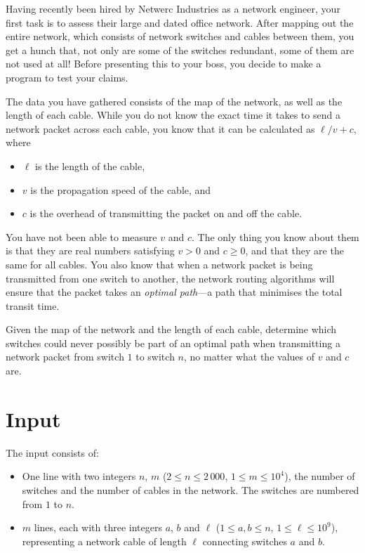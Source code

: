 
%
\noindent
Having recently been hired by Netwerc Industries as a network engineer, your
first task is to assess their large and dated office network. After mapping out
the entire network, which consists of network switches and cables
between them, you get a hunch that, not only are some of the switches
redundant, some of them are not used at all! Before presenting this to
your boss, you decide to make a program to test your claims.

The data you have gathered consists of the map of the network, as well as the
length of each cable. While you do not know the exact time it takes to send a
network packet across each cable, you know that it can be calculated as
$\ell / v + c$, where
\begin{itemize}
    \item $\ell$ is the length of the cable,
    \item $v$ is the propagation speed of the cable, and
    \item $c$ is the overhead of transmitting the packet on and off the cable.
\end{itemize}
You have not been able to measure $v$ and $c$.  The only thing you know about
them is that they are real numbers satisfying $v > 0$ and $c \ge 0$, and that
they are the same
for all cables. You also know that when a network packet is being transmitted
from one switch to another, the network routing algorithms will ensure that the
packet takes an \emph{optimal path}---a path that minimises the total transit
time.

Given the map of the network and the length of each cable, determine which
switches could never possibly be part of an optimal path when transmitting a network packet from
switch $1$ to switch $n$, no matter what the values of $v$ and $c$ are.

\section*{Input}
The input consists of:
\begin{itemize}
    \item One line with two integers $n$, $m$ ($2 \leq n \leq 2\,000$, $1 \leq m \leq 10^4$), the number
    of switches and the number of cables in the network. The switches are numbered
    from $1$ to $n$.
    \item $m$ lines, each with three integers $a$, $b$ and $\ell$ ($1 \leq a, b
    \leq n$, $1\leq \ell \leq 10^9$), representing a network cable of length
    $\ell$ connecting switches $a$ and $b$.
\end{itemize}

